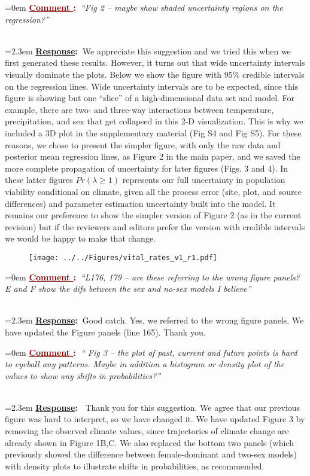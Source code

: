 \documentclass[12pt]{article}
\newcounter{cN}
\newcommand{\comment}[1]{
	\vspace{2em}
	\refstepcounter{cN} %
	\noindent \hangindent=0em \textbf{\textcolor{Maroon}{\uline{Comment \thecN}:~}}\emph{``#1''}
	}
\newcommand{\response}[1]{
	\\[0.25em]
	\hangindent=2.3em \textbf{\textcolor{NavyBlue}{\uline{Response}:~}}#1
	}
\begin{document}
\comment{Fig 2 – maybe show shaded uncertainty regions on the regression?}
\response{We appreciate this suggestion and we tried this when we first generated these results. However, it turns out that wide uncertainty intervals visually dominate the plots. 
Below we show the figure with 95\% credible intervals on the regression lines.
Wide uncertainty intervals are to be expected, since this figure is showing but one ``slice'' of a high-dimensional data set and model. 
For example, there are two- and three-way interactions between temperature, precipitation, and sex that get collapsed in this 2-D visualization. 
This is why we included a 3D plot in the supplementary material (Fig S4 and Fig  S5).
For these reasons, we chose to present the simpler figure, with only the raw data and posterior mean regression lines, as Figure 2 in the main paper, and we saved the more complete propagation of uncertainty for later figures (Figs. 3 and 4).
In these latter figures $Pr(\lambda \ge 1)$ represents our full uncertainty in population viability conditional on climate, given all the process error (site, plot, and source differences) and parameter estimation uncertainty built into the model. 
It remains our preference to show the simpler version of Figure 2 (as in the current revision) but if the reviewers and editors prefer the version with credible intervals we would be happy to make that change. 

\begin{figure}[h!]
	\centering
	\texttt{[image: ../../Figures/vital\_rates\_v1\_r1.pdf]}
	\label{fig:vital_rates}
\end{figure}
}

\comment{L176, 179 – are these referring to the wrong figure panels? E and F show the difs between the sex and no-sex models I believe}
\response{Good catch. Yes, we referred to the wrong figure panels. We have updated the Figure panels (line 165). Thank you.}

\comment{ Fig 3 – the plot of past, current and future points is hard to eyeball any patterns. Maybe in addition a histogram or density plot of the values to show any shifts in probabilities?}
\response{ Thank you for this suggestion. We agree that our previous figure was hard to interpret, so we have changed it. We have updated Figure 3 by removing the observed climate values, since trajectories of climate change are already shown in Figure 1B,C. We also replaced the bottom two panels (which previously showed the difference between female-dominant and two-sex models) with density plots to illustrate shifts in probabilities, as recommended.}
\end{document}
